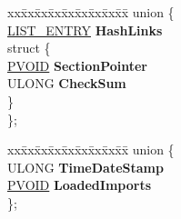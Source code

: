 \begin{DoxyCompactItemize}
\item 
\mbox{\label{struct___l_d_r___d_a_t_a___t_a_b_l_e___e_n_t_r_y_a8e18b835ce1b6142f1f9a4b91842069a}} 
\begin{tabbing}
xx\=xx\=xx\=xx\=xx\=xx\=xx\=xx\=xx\=\kill
union \{\\
\>\hyperlink{struct___l_i_s_t___e_n_t_r_y}{LIST\_ENTRY} {\bfseries HashLinks}\\
\mbox{\label{union___l_d_r___d_a_t_a___t_a_b_l_e___e_n_t_r_y_1_1_0D2138_a01345d33649a1bb09465e0a1d0a73bd7}} 
\>struct \{\\
\>\>\hyperlink{interfacevoid}{PVOID} {\bfseries SectionPointer}\\
\>\>ULONG {\bfseries CheckSum}\\
\>\} \\
\}; \\

\end{tabbing}\item 
\mbox{\label{struct___l_d_r___d_a_t_a___t_a_b_l_e___e_n_t_r_y_aec979f99ae750bfeff1d83ddb4db38d1}} 
\begin{tabbing}
xx\=xx\=xx\=xx\=xx\=xx\=xx\=xx\=xx\=\kill
union \{\\
\>ULONG {\bfseries TimeDateStamp}\\
\>\hyperlink{interfacevoid}{PVOID} {\bfseries LoadedImports}\\
\}; \\


\end{tabbing}
\end{DoxyCompactItemize}

